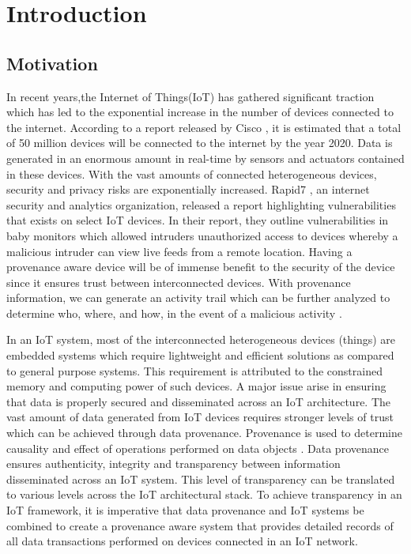 \chapter{Introduction}\label{chapter:introduction}

\section{Motivation}
In recent years,the Internet of Things(IoT) has gathered significant traction which has led to the exponential increase in the number of devices connected to the internet. According to a report released by Cisco \cite{dave}, it is estimated that a total of 50 million devices will be
connected to the internet by the year 2020. Data is generated in an enormous amount in real-time by sensors and actuators contained in these devices. With the vast amounts of connected heterogeneous devices,
security and privacy risks are exponentially increased. Rapid7 \cite{rapid7}, an  internet security and analytics organization, released a report highlighting vulnerabilities that exists on select IoT devices. In their report, they outline  vulnerabilities in
baby monitors which allowed intruders unauthorized access to devices
whereby a malicious intruder can view live feeds from a remote location. Having a provenance aware device will be of immense benefit to the security of the device since it ensures trust between interconnected devices. With provenance information, we can generate an activity trail which can be further analyzed to determine who, where, and how, in the event of a malicious activity \cite{cheney_provenance_2009}. 
\par In an IoT system, most of the interconnected heterogeneous devices (things) are embedded systems which
require lightweight and efficient solutions as compared to general purpose
systems. This requirement is attributed to the constrained memory and computing power of such
devices.  A major issue arise in ensuring that data is properly secured and
disseminated across an IoT architecture. The vast amount of data generated from IoT
devices requires stronger levels of trust which can be achieved through data
provenance. Provenance is used to determine causality and effect of 
operations performed on data objects \cite{glavic_case_2011}. Data provenance ensures
authenticity, integrity and transparency between information disseminated across an
IoT system. This level of transparency can be translated to various levels across the IoT architectural stack. To achieve transparency in an IoT framework, it is imperative that data provenance and IoT systems be combined to create a provenance aware system that provides detailed records of all data
transactions performed on devices connected in an IoT network.






